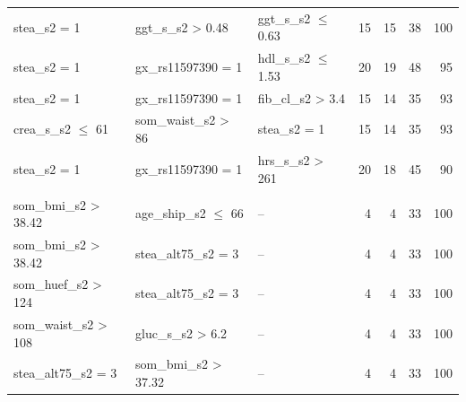 \documentclass[
  oneside]{book}
\begin{document}
\begin{table}[!h]
\begin{tabular}[t]{lllrrrr}
\hspace{1em}stea\_s2 = 1 & ggt\_s\_s2 > 0.48 & ggt\_s\_s2 $\leq$ 0.63 & 15 & 15 & 38 & 100\\
\hspace{1em}stea\_s2 = 1 & gx\_rs11597390 = 1 & hdl\_s\_s2 $\leq$ 1.53 & 20 & 19 & 48 & 95\\
\hspace{1em}stea\_s2 = 1 & gx\_rs11597390 = 1 & fib\_cl\_s2 > 3.4 & 15 & 14 & 35 & 93\\
\hspace{1em}crea\_s\_s2 $\leq$ 61 & som\_waist\_s2 > 86 & stea\_s2 = 1 & 15 & 14 & 35 & 93\\
\hspace{1em}stea\_s2 = 1 & gx\_rs11597390 = 1 & hrs\_s\_s2 > 261 & 20 & 18 & 45 & 90\\
\addlinespace[0.3em]
\multicolumn{7}{l}{\textbf{Target class: C}}\\
\hspace{1em}som\_bmi\_s2 > 38.42 & age\_ship\_s2 $\leq$ 66 & -- & 4 & 4 & 33 & 100\\
\hspace{1em}som\_bmi\_s2 > 38.42 & stea\_alt75\_s2 = 3 & -- & 4 & 4 & 33 & 100\\
\hspace{1em}som\_huef\_s2 > 124 & stea\_alt75\_s2 = 3 & -- & 4 & 4 & 33 & 100\\
\hspace{1em}som\_waist\_s2 > 108 & gluc\_s\_s2 > 6.2 & -- & 4 & 4 & 33 & 100\\
\hspace{1em}stea\_alt75\_s2 = 3 & som\_bmi\_s2 > 37.32 & -- & 4 & 4 & 33 & 100\\
\bottomrule
\end{tabular}
\end{table}
\end{document}
